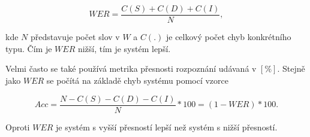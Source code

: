 \begin{equation}
  WER = \frac{C(S) + C(D) + C(I)}{N},
  \label{eq:asr:decoding:wer}
\end{equation}

\noindent kde $N$ představuje počet slov v $\hat{W}$ a $C(.)$ je celkový počet chyb konkrétního typu. Čím je $WER$ nižší, tím je systém lepší.

Velmi často se také používá metrika přesnosti rozpoznání udávaná v $[\%]$. Stejně jako $WER$ se počítá na základě chyb systému pomocí vzorce

\begin{equation}
  Acc = \frac{N - C(S) - C(D) - C(I)}{N} * 100 = \left(1 - WER\right) * 100.
  \label{eq:asr:decoding:acc}
\end{equation}

\noindent Oproti $WER$ je systém s vyšší přesností lepší než systém s nižší přesností.
